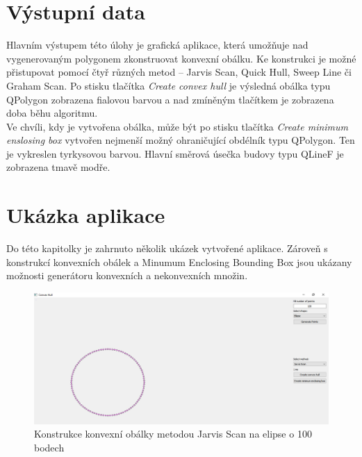 \documentclass[a4paper,11pt,twoside]{article}
\begin{document}
\section{Výstupní data}
Hlavním výstupem této úlohy je grafická aplikace, která umožňuje nad vygenerovaným polygonem zkonstruovat konvexní obálku. Ke konstrukci je možné přistupovat pomocí čtyř různých metod -- Jarvis Scan, Quick Hull, Sweep Line či Graham Scan. Po stisku tlačítka \textit{Create convex hull} je výsledná obálka typu QPolygon zobrazena fialovou barvou a nad zmíněným tlačítkem je zobrazena doba běhu algoritmu. \\
\indent Ve chvíli, kdy je vytvořena obálka, může být po stisku tlačítka \textit{Create minimum enslosing box} vytvořen nejmenší možný ohraničující obdélník typu QPolygon. Ten je vykreslen tyrkysovou barvou. Hlavní směrová úsečka budovy typu QLineF je zobrazena tmavě modře.

\newpage
{}

\vspace*{-1cm}
\section{Ukázka aplikace}
\noindent
\large
Do této kapitolky je zahrnuto několik ukázek vytvořené aplikace. Zároveň s konstrukcí konvexních obálek a Minumum Enclosing Bounding Box jsou ukázany možnosti generátoru konvexních a nekonvexních množin.

\vspace{0.2cm}
\begin{figure}[hbt!] 
\begin{center}
\includegraphics[width=15cm]{pictures/jarvis_ellipse.png} 
\caption[Konstrukce konvexní obálky metodou Jarvis Scan na elipse o 100 bodech]{Konstrukce konvexní obálky metodou Jarvis Scan na elipse o 100 bodech}
\label{fig:jar}
\end{center}
\end{figure}
\vspace{-0.4cm}
\end{document}
